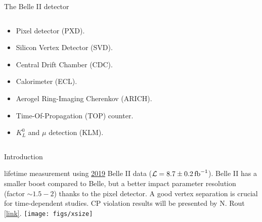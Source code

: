 \begin{frame}{The Belle II detector}
\begin{columns}
\begin{column}{0.45\linewidth} 
\begin{itemize} \small
\item  Pixel detector (PXD).
\vspace{0.25cm}
\item Silicon Vertex Detector (SVD).
\vspace{0.25cm}
\item Central Drift Chamber (CDC).
\vspace{0.25cm}
\item Calorimeter (ECL).
\vspace{0.25cm}
\item Aerogel Ring-Imaging Cherenkov (ARICH).
\vspace{0.25cm}
\item Time-Of-Propagation (TOP) counter.
\vspace{0.25cm}
\item $K_L^0$ and $\mu$ detection (KLM).
\end{itemize}
\end{column}
\begin{column}{0.55\linewidth}
\centering


\end{column}
\end{columns}
\end{frame}

\begin{frame}{Introduction}
\bi
\item \Bz lifetime measurement using \underline{2019} Belle II data ({\small$\mathcal{L}=8.7\pm0.2\mbox{\,fb}^{-1}$}).
\itemi Belle II has a smaller boost compared to Belle, but a better impact parameter resolution (factor $\sim1.5-2$) thanks to the pixel detector.
\bi
{}
\itemiii A good vertex separation is crucial for time-dependent studies.
\itemiii CP violation results will be presented by N. Rout {\small\href{https://indico.cern.ch/event/868940/contributions/3815671/}{\color{blue!40!gray}[link]}}.
\ei
\ei
\centering
\texttt{[image: figs/xsize]} 
\end{frame}
